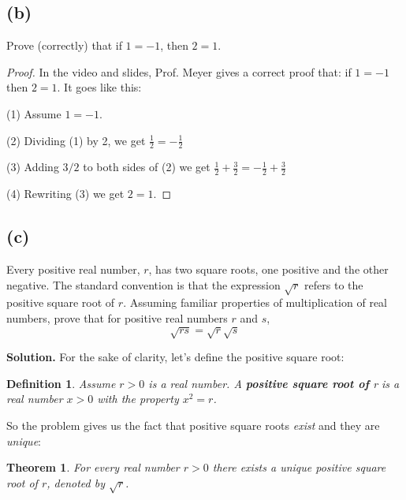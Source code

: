\documentclass[14pt]{extarticle}
\newtheorem{defn}{Definition}
\newtheorem{thm}{Theorem}
\begin{document}
\subsection{(b)}

Prove (correctly) that if $1 = -1$, then $2 = 1$.

\begin{proof}
In the video and slides, Prof. Meyer gives a correct proof that: if $1 = -1$ then $2 = 1$. It goes like this:

(1) Assume $1 = -1$. 

(2) Dividing (1) by 2, we get $\frac{1}{2} = -\frac{1}{2}$

(3) Adding $3/2$ to both sides of (2) we get $\frac{1}{2}  + \frac{3}{2} = -\frac{1}{2} + \frac{3}{2}$

(4) Rewriting (3) we get $2 = 1$.
\end{proof}

\subsection{(c)}

Every positive real number, $r$, has two square roots, one positive and the other negative. The standard convention is that the expression $\sqrt{r}$ refers to the positive square root of $r$. Assuming familiar properties of multiplication of real numbers, prove that for positive real numbers $r$ and $s$,
$$
\sqrt{rs} = \sqrt{r}\sqrt{s}
$$

{\bf Solution.} For the sake of clarity, let's define the positive square root:

\begin{defn} 
Assume $r > 0$ is a real number. A {\bf positive square root of} r is a real number $x > 0$ with the property $x^2 = r$.
\end{defn}

So the problem gives us the fact that positive square roots {\it exist} and they are {\it unique}:

\begin{thm}
For every real number $r > 0$ there exists a unique positive square root of $r$, denoted by $\sqrt{r}$.
\end{thm}
\end{document}
